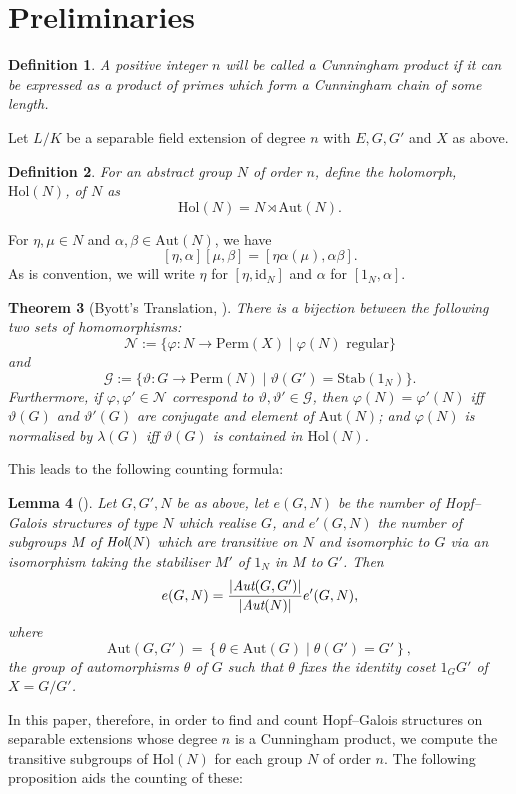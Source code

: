 \documentclass[a4paper,reqno]{amsart}
\newtheorem{theorem}{Theorem}[section]
\newtheorem{lemma}[theorem]{Lemma}
\newtheorem{definition}[theorem]{Definition}
\theoremstyle{definition}
\newcommand{\Aut}{\mathrm{Aut}}
\newcommand{\Hol}{\mathrm{Hol}}
\begin{document}
\section{Preliminaries}
\begin{definition}
    A positive integer $n$ will be called a \emph{Cunningham product} if it can be expressed as a product of primes which form a Cunningham chain of some length.
\end{definition}
    Let $L/K$ be a separable field extension of degree $n$ with $E,G,G'$ and $X$ as above.
\begin{definition}
    For an abstract group $N$ of order $n$, define the holomorph, $\Hol(N)$, of $N$ as
    \[\Hol(N) = N \rtimes \Aut(N).\]
\end{definition}
For $\eta,\mu \in N$ and $\alpha,\beta \in \Aut(N)$, we have
\[[\eta,\alpha][\mu,\beta]=[\eta\alpha(\mu),\alpha\beta].\]
As is convention, we will write $\eta$ for $[\eta,\text{id}_N]$ and $\alpha$ for $[1_N,\alpha]$.
\begin{theorem}[Byott's Translation, \cite{Chi00}]
    There is a bijection between the following two sets of homomorphisms:
    \[\mathcal{N}:=\{\varphi:N \rightarrow \mathrm{Perm}(X) \mid \varphi(N) \text{ regular}\}\]
    and
    \[\mathcal{G}:=\{\vartheta:G\rightarrow \mathrm{Perm}(N) \mid \vartheta(G')=\mathrm{Stab}(1_N)\}.\]
    Furthermore, if $\varphi,\varphi' \in \mathcal{N}$ correspond to $\vartheta,\vartheta' \in \mathcal{G}$, then $\varphi(N)=\varphi'(N)$ iff $\vartheta(G)$ and $\vartheta'(G)$ are conjugate and element of $\Aut(N)$; and $\varphi(N)$ is normalised by $\lambda(G)$ iff $\vartheta(G)$ is contained in $\Hol(N)$.
\end{theorem}
This leads to the following counting formula:
\begin{lemma}[\cite{Byo96}]\label{Byott_num_HGS}
    Let $G,G',N$ be as above, let $e(G,N)$ be the number of Hopf--Galois structures of type $N$ which realise $G$, and $e'(G,N)$ the number of subgroups $M$ of $\emph{Hol}(N)$ which are transitive on $N$ and isomorphic to $G$ via an isomorphism taking the stabiliser $M'$ of $1_N$ in $M$ to $G'$. Then
    \[e(G,N)=\frac{|\emph{Aut}(G,G')|}{|\emph{Aut}(N)|}e'(G,N),\]
    where
    \[\Aut(G,G')=\left\{\theta\in\Aut(G) \mid \theta(G')=G'\right\},\]
    the group of automorphisms $\theta$ of $G$ such that $\theta$ fixes the identity coset $1_GG'$ of $X=G/G'$.
\end{lemma}
In this paper, therefore, in order to find and count Hopf--Galois structures on separable extensions whose degree $n$ is a Cunningham product, we compute the transitive subgroups of $\Hol(N)$ for each group $N$ of order $n$. The following proposition aids the counting of these:
\end{document}
